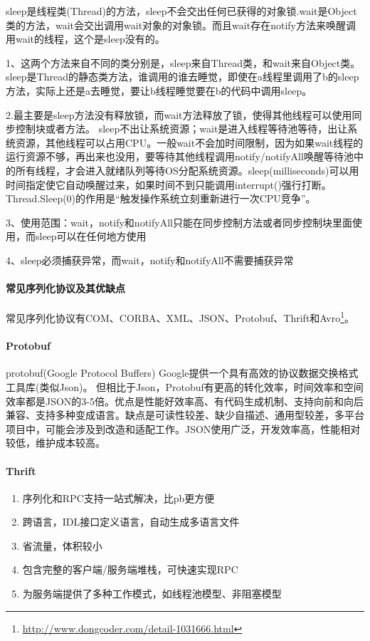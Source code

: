 \documentclass[../../../interview-questions.tex]{subfiles}
\begin{document}
sleep是线程类(Thread)的方法，sleep不会交出任何已获得的对象锁.wait是Object类的方法，wait会交出调用wait对象的对象锁。而且wait存在notify方法来唤醒调用wait的线程，这个是sleep没有的。

1、这两个方法来自不同的类分别是，sleep来自Thread类，和wait来自Object类。
sleep是Thread的静态类方法，谁调用的谁去睡觉，即使在a线程里调用了b的sleep方法，实际上还是a去睡觉，要让b线程睡觉要在b的代码中调用sleep。

2.最主要是sleep方法没有释放锁，而wait方法释放了锁，使得其他线程可以使用同步控制块或者方法。
sleep不出让系统资源；wait是进入线程等待池等待，出让系统资源，其他线程可以占用CPU。一般wait不会加时间限制，因为如果wait线程的运行资源不够，再出来也没用，要等待其他线程调用notify/notifyAll唤醒等待池中的所有线程，才会进入就绪队列等待OS分配系统资源。sleep(milliseconds)可以用时间指定使它自动唤醒过来，如果时间不到只能调用interrupt()强行打断。
Thread.Sleep(0)的作用是“触发操作系统立刻重新进行一次CPU竞争”。

3、使用范围：wait，notify和notifyAll只能在同步控制方法或者同步控制块里面使用，而sleep可以在任何地方使用

4、sleep必须捕获异常，而wait，notify和notifyAll不需要捕获异常


\paragraph{常见序列化协议及其优缺点}

常见序列化协议有COM、CORBA、XML、JSON、Protobuf、Thrift和Avro\footnote{\url{http://www.dongcoder.com/detail-1031666.html}}。

\paragraph{Protobuf}protobuf(Google Protocol Buffers)
Google提供一个具有高效的协议数据交换格式工具库(类似Json)。
但相比于Json，Protobuf有更高的转化效率，时间效率和空间效率都是JSON的3-5倍。优点是性能好效率高、有代码生成机制、支持向前和向后兼容、支持多种变成语言。缺点是可读性较差、缺少自描述、通用型较差，多平台项目中，可能会涉及到改造和适配工作。JSON使用广泛，开发效率高，性能相对较低，维护成本较高。

\paragraph{Thrift}

\begin{enumerate}
\item {序列化和RPC支持一站式解决，比pb更方便}
\item{跨语言，IDL接口定义语言，自动生成多语言文件}
\item{省流量，体积较小}
\item{包含完整的客户端/服务端堆栈，可快速实现RPC}
\item{为服务端提供了多种工作模式，如线程池模型、非阻塞模型}
\end{enumerate}
\end{document}
